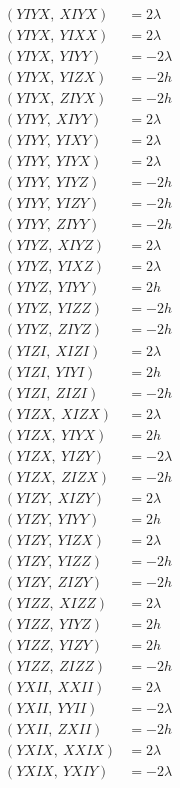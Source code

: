 \documentclass{article}
\begin{document}
\begin{align*}
  (YIYX,\ XIYX) &= 2 \lambda \\
  (YIYX,\ YIXX) &= 2 \lambda \\
  (YIYX,\ YIYY) &= - 2 \lambda \\
  (YIYX,\ YIZX) &= - 2 h \\
  (YIYX,\ ZIYX) &= - 2 h \\
  (YIYY,\ XIYY) &= 2 \lambda \\
  (YIYY,\ YIXY) &= 2 \lambda \\
  (YIYY,\ YIYX) &= 2 \lambda \\
  (YIYY,\ YIYZ) &= - 2 h \\
  (YIYY,\ YIZY) &= - 2 h \\
  (YIYY,\ ZIYY) &= - 2 h \\
  (YIYZ,\ XIYZ) &= 2 \lambda \\
  (YIYZ,\ YIXZ) &= 2 \lambda \\
  (YIYZ,\ YIYY) &= 2 h \\
  (YIYZ,\ YIZZ) &= - 2 h \\
  (YIYZ,\ ZIYZ) &= - 2 h \\
  (YIZI,\ XIZI) &= 2 \lambda \\
  (YIZI,\ YIYI) &= 2 h \\
  (YIZI,\ ZIZI) &= - 2 h \\
  (YIZX,\ XIZX) &= 2 \lambda \\
  (YIZX,\ YIYX) &= 2 h \\
  (YIZX,\ YIZY) &= - 2 \lambda \\
  (YIZX,\ ZIZX) &= - 2 h \\
  (YIZY,\ XIZY) &= 2 \lambda \\
  (YIZY,\ YIYY) &= 2 h \\
  (YIZY,\ YIZX) &= 2 \lambda \\
  (YIZY,\ YIZZ) &= - 2 h \\
  (YIZY,\ ZIZY) &= - 2 h \\
  (YIZZ,\ XIZZ) &= 2 \lambda \\
  (YIZZ,\ YIYZ) &= 2 h \\
  (YIZZ,\ YIZY) &= 2 h \\
  (YIZZ,\ ZIZZ) &= - 2 h \\
  (YXII,\ XXII) &= 2 \lambda \\
  (YXII,\ YYII) &= - 2 \lambda \\
  (YXII,\ ZXII) &= - 2 h \\
  (YXIX,\ XXIX) &= 2 \lambda \\
  (YXIX,\ YXIY) &= - 2 \lambda \\

\end{align*}
\end{document}
